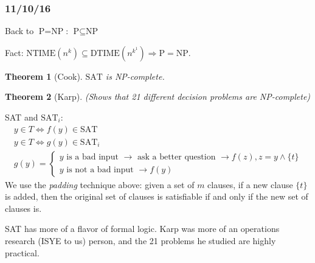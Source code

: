 \documentclass[a4paper,12pt]{article}
\newtheorem{theorem}{Theorem}
\theoremstyle{remark}
\theoremstyle{definition}
\begin{document}
\subsubsection*{11/10/16}
Back to $\text{P} = \text{NP}$: $\text{P} \subseteq \text{NP}$ \par
Fact: $\text{NTIME}(n^k) \subseteq \text{DTIME}(n^{k^1}) \Rightarrow \text{P} = \text{NP}$.
\begin{theorem}[Cook]
    $\text{SAT}$ is NP-complete.
\end{theorem}
\begin{theorem}[Karp]
    (Shows that 21 different decision problems are NP-complete)
\end{theorem}
SAT and $\text{SAT}_i$:
\begin{gather*}
    y \in T \Leftrightarrow f(y) \in \text{SAT} \\
    y \in T \Leftrightarrow g(y) \in \text{SAT}_i \\
    g(y) = \begin{cases}
        y \text{ is a bad input } \rightarrow \text{ ask a better question } \rightarrow f(z), z = y \land \{t\} \\
        y \text{ is not a bad input } \rightarrow f(y)
    \end{cases}
\end{gather*}
We use the \emph{padding} technique above: given a set of $m$ clauses, if a new clause $\{t\}$ is added, then the original set of clauses is satisfiable if and only if the new set of clauses is. \par
SAT has more of a flavor of formal logic. Karp was more of an operations research (ISYE to us) person, and the 21 problems he studied are highly practical.
\end{document}
